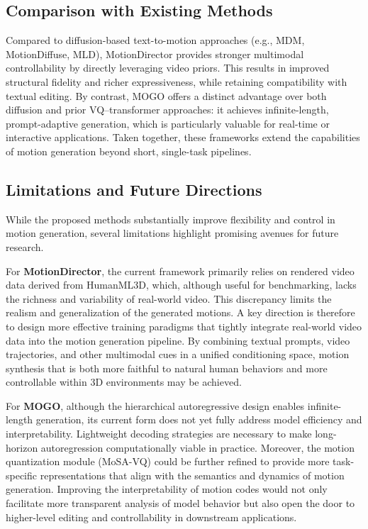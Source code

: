 \documentclass[a4paper,12pt]{article}
\begin{document}
\subsection{Comparison with Existing Methods}
Compared to diffusion-based text-to-motion approaches (e.g., MDM, MotionDiffuse, MLD), MotionDirector provides stronger multimodal controllability by directly leveraging video priors. This results in improved structural fidelity and richer expressiveness, while retaining compatibility with textual editing. By contrast, MOGO offers a distinct advantage over both diffusion and prior VQ–transformer approaches: it achieves infinite-length, prompt-adaptive generation, which is particularly valuable for real-time or interactive applications. Taken together, these frameworks extend the capabilities of motion generation beyond short, single-task pipelines.

\subsection{Limitations and Future Directions}
While the proposed methods substantially improve flexibility and control in motion generation, several limitations highlight promising avenues for future research. 

For \textbf{MotionDirector}, the current framework primarily relies on rendered video data derived from HumanML3D, which, although useful for benchmarking, lacks the richness and variability of real-world video. This discrepancy limits the realism and generalization of the generated motions. A key direction is therefore to design more effective training paradigms that tightly integrate real-world video data into the motion generation pipeline. By combining textual prompts, video trajectories, and other multimodal cues in a unified conditioning space, motion synthesis that is both more faithful to natural human behaviors and more controllable within 3D environments may be achieved.

For \textbf{MOGO}, although the hierarchical autoregressive design enables infinite-length generation, its current form does not yet fully address model efficiency and interpretability. Lightweight decoding strategies are necessary to make long-horizon autoregression computationally viable in practice. Moreover, the motion quantization module (MoSA-VQ) could be further refined to provide more task-specific representations that align with the semantics and dynamics of motion generation. Improving the interpretability of motion codes would not only facilitate more transparent analysis of model behavior but also open the door to higher-level editing and controllability in downstream applications.
\end{document}

